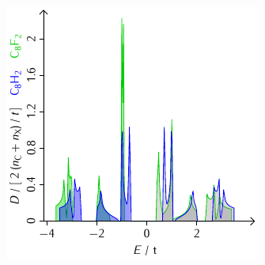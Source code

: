 \documentclass{beamer}
\begin{document}
\begin{frame}
\begin{minipage}{0.48\textwidth}
		\end{minipage}
		\hfill
		\begin{minipage}{0.48\textwidth}
			\includegraphics[width=\textwidth]{Abbildungen/Bandstrukturen/DOS_C8X2.pdf}
		\end{minipage}
	\end{frame}
	
\end{document}
